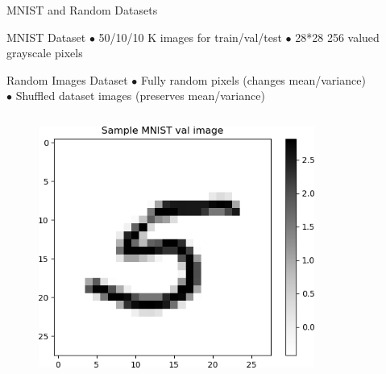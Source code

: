 \documentclass{beamer}
\begin{document}
\begin{frame}{MNIST and Random Datasets}
    \begin{block}{MNIST Dataset}
    $\bullet$ 50/10/10 K images for train/val/test $\bullet$ 28*28 256 valued grayscale pixels\\ 
    \end{block}
    \begin{block}{Random Images Dataset}
    $\bullet$ Fully random pixels (changes mean/variance)\\
    $\bullet$ Shuffled dataset images (preserves mean/variance)\\ 
    \end{block}
    
    \begin{columns}
    \begin{column}{.33\textwidth}
    \begin{figure}
        \centering
        \includegraphics[width=.99\textwidth]{images/mnist-behavior/MNIST-Sample.png}
    \end{figure}
    \end{column}
    \begin{column}{.33\textwidth}
    \begin{figure}
        \centering

\end{figure}
\end{column}
\end{columns}
\end{frame}
\end{document}
